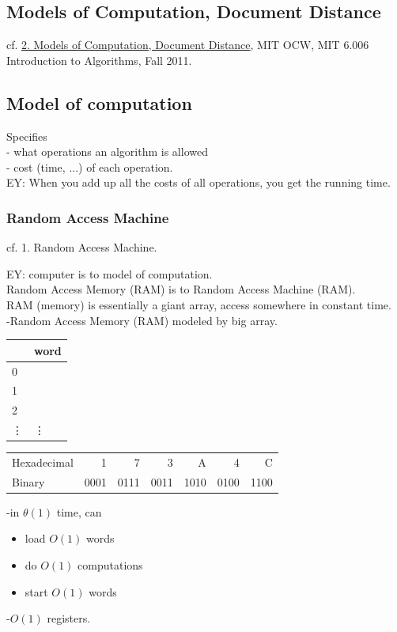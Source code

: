 \documentclass[10pt]{amsart}
\begin{document}
\begin{multicols*}{2}
\section{Models of Computation, Document Distance}

cf. \href{https://youtu.be/Zc54gFhdpLA}{2. Models of Computation, Document Distance}, MIT OCW, MIT 6.006 Introduction to Algorithms, Fall 2011.

\subsection{Model of computation}

Specifies \\
- what operations an algorithm is allowed \\
- cost (time, ...) of each operation. \\
EY: When you add up all the costs of all operations, you get the running time.

\subsubsection{Random Access Machine}

cf. 1. Random Access Machine.

EY: computer is to model of computation. \\
Random Access Memory (RAM) is to Random Access Machine (RAM). \\
RAM (memory) is essentially a giant array, access somewhere in constant time. \\
-Random Access Memory (RAM) modeled by big array.  

\begin{table}
	\begin{tabular}{ l|l}
		& word \\ \hline
	0	&   \\ \hline
	1	&   \\ \hline
	2	&   \\ \hline
	\vdots	&  \vdots \\  \hline
	\end{tabular}
\end{table}
\begin{center}
	\begin{tabular}{ l | r | r | r | r | r | r }
		Hexadecimal & 1 & 7 & 3 & A & 4 & C \\
		Binary & 0001 & 0111& 0011 & 1010 & 0100 & 1100 \\
	\end{tabular}
\end{center}
-in $\theta(1)$ time, can \\
\begin{itemize}
	\item load $O(1)$ words 
	\item do $O(1)$ computations
	\item start $O(1)$ words
\end{itemize}
-$O(1)$ registers.


\end{multicols*}
\end{document}
